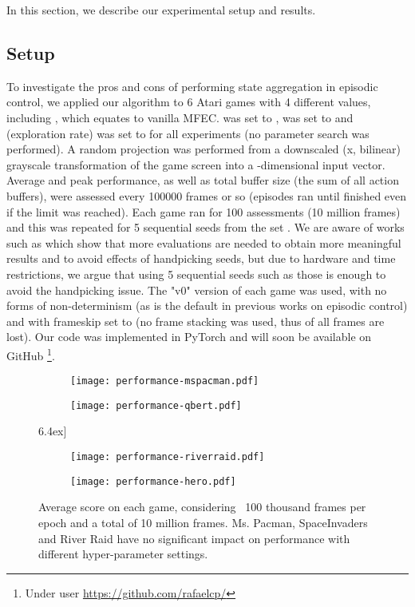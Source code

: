 \documentclass{article}
\begin{document}
In this section, we describe our experimental setup and results.

\subsection{Setup}
To investigate the pros and cons of performing state aggregation in episodic control, we applied our algorithm to 6 Atari games with 4 different  values, including , which equates to vanilla MFEC.  was set to ,  was set to  and  (exploration rate) was set to  for all experiments (no parameter search was performed). A random projection was performed from a downscaled (x, bilinear) grayscale transformation of the game screen into a -dimensional input vector. Average and peak performance, as well as total buffer size (the sum of all action buffers), were assessed every 100000 frames or so (episodes ran until finished even if the limit was reached). Each game ran for 100 assessments (10 million frames) and this was repeated for 5 sequential seeds from the set . We are aware of works such as \cite{henderson2018deep} which show that more evaluations are needed to obtain more meaningful results and to avoid effects of handpicking seeds, but due to hardware and time restrictions, we argue that using 5 sequential seeds such as those is enough to avoid the handpicking issue. The "v0" version of each game was used, with no forms of non-determinism (as is the default in previous works on episodic control) and with frameskip set to  (no frame stacking was used, thus  of all frames are lost). Our code was implemented in PyTorch \cite{paszke2019pytorch} and will soon be available on GitHub \footnote{Under user  \url{https://github.com/rafaelcp/}}. 

\begin{figure}[htb]
    \centering
    \begin{subfigure}{.49\textwidth}
        \centering
        \texttt{[image: performance-mspacman.pdf]}
        \label{fig:perf-mspacman}
    \end{subfigure}
    \begin{subfigure}{.49\textwidth}
        \centering
        \texttt{[image: performance-qbert.pdf]}
        \label{fig:perf-qbert}
    \end{subfigure}\-6.4ex]
    \begin{subfigure}{.49\textwidth}
        \centering
        \texttt{[image: performance-riverraid.pdf]}
        \label{fig:perf-riverraid}
    \end{subfigure}
    \begin{subfigure}{.49\textwidth}
        \centering
        \texttt{[image: performance-hero.pdf]}
        \label{fig:perf-hero}
    \end{subfigure}\vspace{-1.5\baselineskip}
    
    \caption{Average score on each game, considering ~100 thousand frames per epoch and a total of 10 million frames. Ms. Pacman, SpaceInvaders and River Raid have no significant impact on performance with different hyper-parameter settings.}
    \label{fig:perf}
\end{figure}
\end{document}
